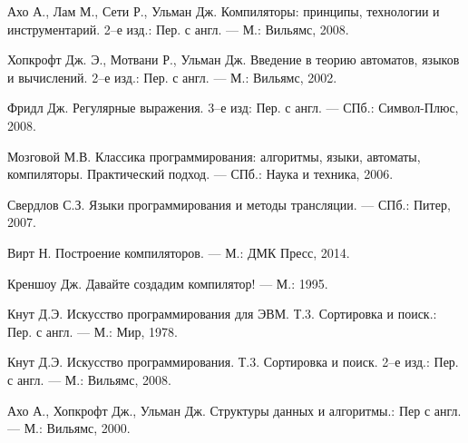 \documentclass[10pt]{article}
\begin{document}
\newpage
\renewcommand{\bibname}{Список литературы}
\begin{thebibliography}{9}
 Ахо А., Лам М., Сети Р., Ульман Дж. Компиляторы: принципы, технологии и инструментарий. 2--е изд.: Пер. с англ. --- М.: Вильямс, 2008.

 Хопкрофт Дж. Э., Мотвани Р., Ульман Дж. Введение в теорию автоматов, языков и вычислений.  2--е изд.: Пер. с англ. --- М.: Вильямс, 2002.

 Фридл Дж. Регулярные выражения. 3--е изд: Пер. с англ. --- СПб.: Символ-Плюс, 2008.

 Мозговой М.В. Классика программирования: алгоритмы, языки, автоматы, компиляторы. Практический подход. --- СПб.: Наука и техника, 2006.

 Свердлов С.З. Языки программирования и методы трансляции. --- СПб.: Питер, 2007.

 Вирт Н. Построение компиляторов. --- М.: ДМК Пресс, 2014.

 Креншоу Дж. Давайте создадим компилятор! --- М.: 1995.

 Кнут Д.Э. Искусство программирования для ЭВМ. Т.3. Сортировка и поиск.: Пер. с англ. --- М.: Мир, 1978.

 Кнут Д.Э. Искусство программирования. Т.3. Сортировка и поиск. 2--е изд.: Пер. с англ. --- М.: Вильямс, 2008.

 Ахо А., Хопкрофт Дж., Ульман Дж. Структуры данных и алгоритмы.: Пер с англ. --- М.: Вильямс, 2000.
\end{thebibliography}
\end{document}
